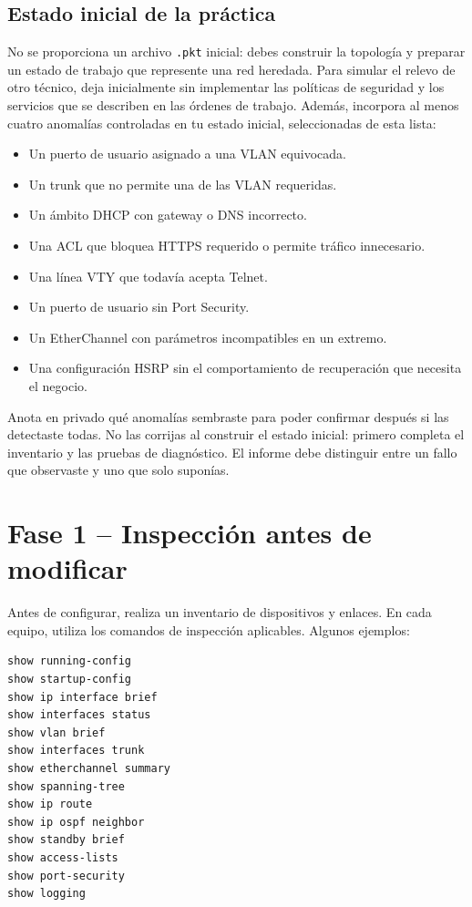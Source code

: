 \documentclass[12pt,a4paper]{article}
\begin{document}
\subsection{Estado inicial de la práctica}
No se proporciona un archivo \texttt{.pkt} inicial: debes construir la topología y preparar un estado de trabajo que represente una red heredada. Para simular el relevo de otro técnico, deja inicialmente sin implementar las políticas de seguridad y los servicios que se describen en las órdenes de trabajo. Además, incorpora al menos cuatro anomalías controladas en tu estado inicial, seleccionadas de esta lista:
\begin{itemize}[leftmargin=1.2cm]
 \item Un puerto de usuario asignado a una VLAN equivocada.
 \item Un trunk que no permite una de las VLAN requeridas.
 \item Un ámbito DHCP con gateway o DNS incorrecto.
 \item Una ACL que bloquea HTTPS requerido o permite tráfico innecesario.
 \item Una línea VTY que todavía acepta Telnet.
 \item Un puerto de usuario sin Port Security.
 \item Un EtherChannel con parámetros incompatibles en un extremo.
 \item Una configuración HSRP sin el comportamiento de recuperación que necesita el negocio.
\end{itemize}
Anota en privado qué anomalías sembraste para poder confirmar después si las detectaste todas. No las corrijas al construir el estado inicial: primero completa el inventario y las pruebas de diagnóstico. El informe debe distinguir entre un fallo que observaste y uno que solo suponías.

\section{Fase 1 -- Inspección antes de modificar}

Antes de configurar, realiza un inventario de dispositivos y enlaces. En cada equipo, utiliza los comandos de inspección aplicables. Algunos ejemplos:
\begin{lstlisting}
show running-config
show startup-config
show ip interface brief
show interfaces status
show vlan brief
show interfaces trunk
show etherchannel summary
show spanning-tree
show ip route
show ip ospf neighbor
show standby brief
show access-lists
show port-security
show logging
\end{lstlisting}
\end{document}
